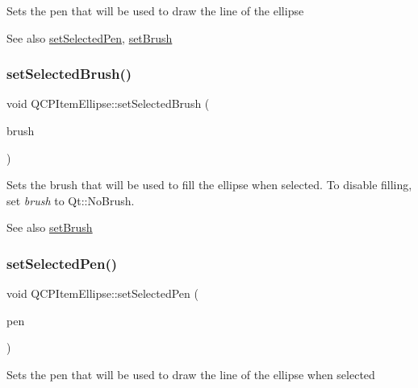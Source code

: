 Sets the pen that will be used to draw the line of the ellipse

\begin{DoxySeeAlso}{See also}
\hyperlink{class_q_c_p_item_ellipse_a6c542fba1dc918041c583f58a50dde99}{set\+Selected\+Pen}, \hyperlink{class_q_c_p_item_ellipse_a49fc74e6965834e873d027d026def798}{set\+Brush} 
\end{DoxySeeAlso}
\mbox{\label{class_q_c_p_item_ellipse_a9693501cfaa43a099655c75bed0dab3f}} 
\subsubsection{\texorpdfstring{set\+Selected\+Brush()}{setSelectedBrush()}}
{\footnotesize\ttfamily void Q\+C\+P\+Item\+Ellipse\+::set\+Selected\+Brush (\begin{DoxyParamCaption}\item[{const Q\+Brush \&}]{brush }\end{DoxyParamCaption})}

Sets the brush that will be used to fill the ellipse when selected. To disable filling, set {\itshape brush} to Qt\+::\+No\+Brush.

\begin{DoxySeeAlso}{See also}
\hyperlink{class_q_c_p_item_ellipse_a49fc74e6965834e873d027d026def798}{set\+Brush} 
\end{DoxySeeAlso}
\mbox{\label{class_q_c_p_item_ellipse_a6c542fba1dc918041c583f58a50dde99}} 
\subsubsection{\texorpdfstring{set\+Selected\+Pen()}{setSelectedPen()}}
{\footnotesize\ttfamily void Q\+C\+P\+Item\+Ellipse\+::set\+Selected\+Pen (\begin{DoxyParamCaption}\item[{const Q\+Pen \&}]{pen }\end{DoxyParamCaption})}

Sets the pen that will be used to draw the line of the ellipse when selected

